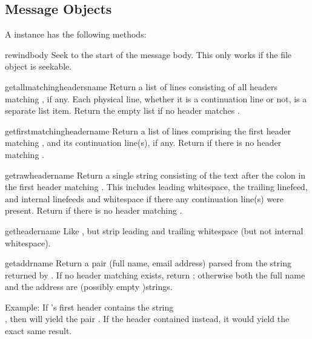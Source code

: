 \subsection{Message Objects}

A  instance has the following methods:

\begin{funcdesc}{rewindbody}{}
Seek to the start of the message body.  This only works if the file
object is seekable.
\end{funcdesc}

\begin{funcdesc}{getallmatchingheaders}{name}
Return a list of lines consisting of all headers matching
, if any.  Each physical line, whether it is a continuation
line or not, is a separate list item.  Return the empty list if no
header matches .
\end{funcdesc}

\begin{funcdesc}{getfirstmatchingheader}{name}
Return a list of lines comprising the first header matching
, and its continuation line(s), if any.  Return 
if there is no header matching .
\end{funcdesc}

\begin{funcdesc}{getrawheader}{name}
Return a single string consisting of the text after the colon in the
first header matching .  This includes leading whitespace,
the trailing linefeed, and internal linefeeds and whitespace if there
any continuation line(s) were present.  Return  if there is
no header matching .
\end{funcdesc}

\begin{funcdesc}{getheader}{name}
Like , but strip leading and trailing
whitespace (but not internal whitespace).
\end{funcdesc}

\begin{funcdesc}{getaddr}{name}
Return a pair (full name, email address) parsed from the string
returned by .  If no header matching
 exists, return ; otherwise both the full
name and the address are (possibly empty )strings.

Example: If 's first  header contains the string\\
, then
 will yield the pair
.
If the header contained
 instead, it would yield the
exact same result.
\end{funcdesc}

